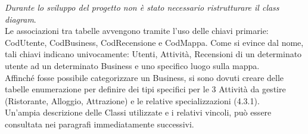 \documentclass[a4paper,12pt]{article}
\begin{document}
\normalsize{
{\small \it* Durante lo sviluppo del progetto non è stato necessario ristrutturare il  class diagram}.
\vspace*{+0.2cm}
\\Le associazioni tra tabelle avvengono tramite l'uso delle chiavi primarie: CodUtente, CodBusiness, CodRecensione e CodMappa. Come si evince dal nome, tali chiavi indicano univocamente: Utenti, Attività, Recensioni di un determinato utente ad un determinato Business e uno specifico luogo sulla mappa.
\vspace*{+0.2cm}
\\Affinché fosse possibile categorizzare un Business, si sono dovuti creare delle tabelle enumerazione per definire dei tipi specifici per le 3 Attività da gestire (Ristorante, Alloggio, Attrazione) e le relative specializzazioni (4.3.1).
\vspace*{+0.2cm}
\\Un'ampia descrizione delle Classi utilizzate e i relativi vincoli, può essere consultata nei paragrafi immediatamente successivi.
}

\newpage
\end{document}
